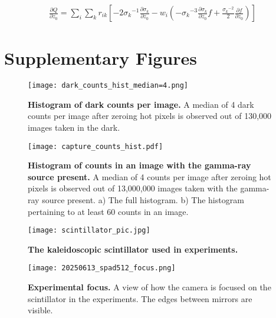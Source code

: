 \begin{align}
\frac{\partial Q}{\partial z_0} = \sum_i \sum_k r_{ik} \left[ -2{\sigma_k}^{-1}\frac{\partial \sigma_k}{\partial z_0} - w_i\left( -{\sigma_k}^{-3} \frac{\partial \sigma_k}{\partial z_0}f + \frac{{\sigma_k}^{-2}}{2} \frac{\partial f}{\partial z_0}  \right) \right] 
\end{align}


\section{Supplementary Figures}

\begin{figure}
\centering
\texttt{[image: dark\_counts\_hist\_median=4.png]}
\caption{\textbf{Histogram of dark counts per image.} A median of 4 dark counts 
per image after zeroing hot pixels is observed out of 130,000 images taken in the dark.} 
\label{fig:dark_counts_hist}
\end{figure}


\begin{figure}
\centering
\texttt{[image: capture\_counts\_hist.pdf]}
\caption{\textbf{Histogram of counts in an image with the gamma-ray source present.} A median of 4 counts 
per image after zeroing hot pixels is observed out of 13,000,000 images taken with 
the gamma-ray source present. 
a) The full histogram. 
b) The histogram pertaining to at least 60 counts in an image.} 
\label{fig:cap_counts_hist}
\end{figure}



\begin{figure}
\centering
\texttt{[image: scintillator\_pic.jpg]}
\caption{\textbf{The kaleidoscopic scintillator used in experiments.}}
\label{fig:scintillator}
\end{figure}

\iffalse
\begin{figure}
\centering
\texttt{[image: setup\_pic.jpg]}
\caption{The experimental setup without the gamma-ray source.} 
\label{fig:setup}
\end{figure}
\fi

\begin{figure}
\centering
\texttt{[image: 20250613\_spad512\_focus.png]}
\caption{\textbf{Experimental focus.} A view of how the camera is focused on the scintillator in the experiments. The edges between mirrors are visible.} 
\label{fig:experiment_focus}
\end{figure}




